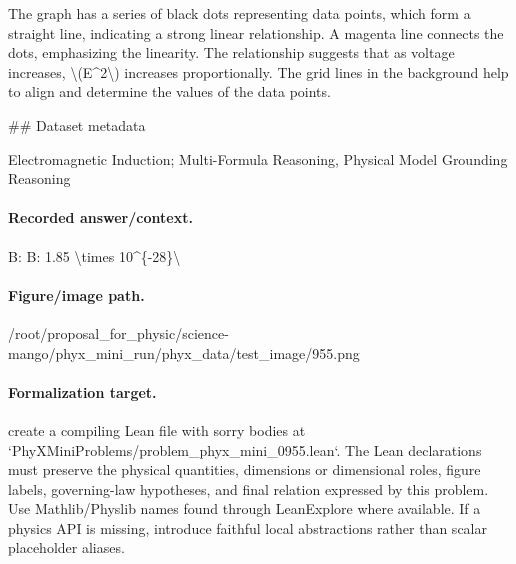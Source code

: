 The graph has a series of black dots representing data points, which form a straight line, indicating a strong linear relationship. A magenta line connects the dots, emphasizing the linearity. The relationship suggests that as voltage increases, \textbackslash{}(E\textasciicircum{}2\textbackslash{}) increases proportionally. The grid lines in the background help to align and determine the values of the data points.

\#\# Dataset metadata

Electromagnetic Induction; Multi-Formula Reasoning, Physical Model Grounding Reasoning

\paragraph{Recorded answer/context.}
B: B: 1.85 \textbackslash{}times 10\textasciicircum{}\{-28\}\textbackslash{}

\paragraph{Figure/image path.}
/root/proposal\_for\_physic/science-mango/phyx\_mini\_run/phyx\_data/test\_image/955.png

\paragraph{Formalization target.}
create a compiling Lean file with sorry bodies at `PhyXMiniProblems/problem\_phyx\_mini\_0955.lean`. The Lean declarations must preserve the physical quantities, dimensions or dimensional roles, figure labels, governing-law hypotheses, and final relation expressed by this problem.
Use Mathlib/Physlib names found through LeanExplore where available. If a physics API is missing, introduce faithful local abstractions rather than scalar placeholder aliases.

